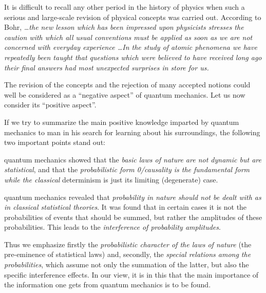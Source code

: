\documentclass[a4paper,sfsidenotes,colorlinks=true]{tufte-book}
\numberwithin{equation}{section}
\numberwithin{figure}{section}
\begin{document}
It is difficult to recall any other period in the history of physics
when such a serious and large-scale revision of physical concepts was
carried out. According to Bohr, \emph{\ldots the new lesson which has
  been impressed upon physicists stresses the caution with which all
  usual conventions must be applied as soon as we are not concerned
  with everyday experience \ldots In the study of atomic phenomena we have repeatedly been taught that questions which were believed to have received long ago their final answers had most unexpected surprises in store for us.}

The  revision of the
concepts and the rejection of many accepted notions could well be
considered as a ``negative aspect'' of quantum mechanics. Let us now
consider its ``positive aspect''.


If we try to summarize the main positive knowledge imparted by
quantum mechanics to man in his search for learning about his
surroundings, the following two important points stand out:

\begin{description}[leftmargin=1cm]
\item[First:] quantum mechanics showed that the \emph{basic laws of nature
  are not dynamic but are statistical}, and that the \emph{probabilistic form
  0/causality is the fundamental form while the classical} determinism
  is just its limiting (degenerate) case.


\item[Second:] quantum mechanics revealed that \emph{probability in
    nature should not be dealt with as in classical statistical
    theories}. It was found that in certain cases it is not the
  probabilities of events that should be summed, but rather the
  amplitudes of these probabilities. This leads to the
  \emph{interference of probability amplitudes}.
\end{description}

Thus we emphasize firstly the \emph{probabilistic character of the laws of
nature} (the pre-eminence of statistical laws) and, secondly, the
\emph{special relations among the probabilities}, which assume not only the
summation of the latter, but also the specific interference
effects. In our view, it is in this that the main importance of the
information one gets from quantum mechanics is to be found.
\end{document}
